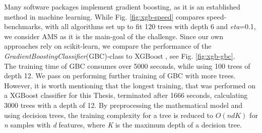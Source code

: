 Many software packages implement gradient boosting, as it is an established method in machine learning. While Fig. \ref{fig:xgb-speed} compares speed-benchmarks, with all algorithms set up to fit 120 trees with depth 6 and \emph{eta}=0.1, we consider AMS as it is the main-goal of the challenge. Since our own approaches rely on scikit-learn, we compare the performance of the \emph{GradientBoostingClassifier}(GBC)-class to XGBoost , see Fig. \ref{fig:xgb-gbc}.\\
The training time of GBC consumes over 5000 seconds, while using 100 trees of depth 12. We pass on performing further training of GBC with more trees. However, it is worth mentioning that the longest training, that was performed on a XGBoost classifier for this Thesis, terminated after 1666 seconds, calculating 3000 trees with a depth of 12.
By preprocessing the mathematical model and using decision trees, the training complexity for a tree is reduced to $O(ndK)$ for \emph{n} samples with \emph{d} features, where \emph{K} is the maximum depth of a decision tree.

